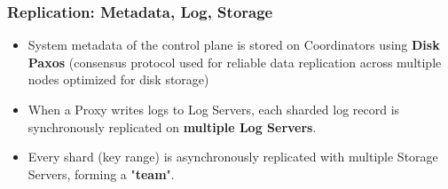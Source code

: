 




\begin{frame}
	\frametitle{Replication: Metadata, Log, Storage}
    \begin{itemize}
      \item System metadata of the control plane is stored on Coordinators using \textbf{Disk Paxos} (consensus protocol used for reliable data replication across multiple nodes optimized for disk storage)
      \item When a Proxy writes logs to Log Servers, each sharded log record is synchronously replicated on \textbf{multiple Log Servers}.
      \item Every shard (key range) is asynchronously replicated with multiple Storage Servers, forming a "\textbf{team}".

\end{itemize}
\end{frame}




